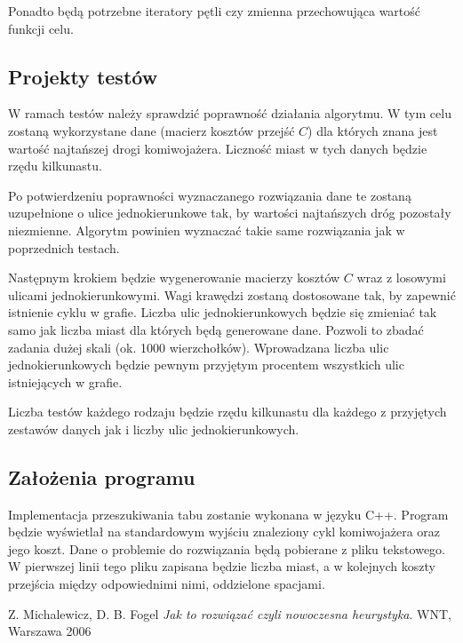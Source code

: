 \documentclass[11pt,a4paper,twoside]{article}
\begin{document}
Ponadto będą potrzebne iteratory pętli czy zmienna przechowująca wartość funkcji celu.

\subsection{Projekty testów}
W ramach testów należy sprawdzić poprawność działania algorytmu. W tym celu zostaną wykorzystane dane (macierz kosztów przejść $C$) dla których znana jest wartość najtańszej drogi komiwojażera. Liczność miast w tych danych będzie rzędu kilkunastu.

Po potwierdzeniu poprawności wyznaczanego rozwiązania dane te zostaną uzupełnione o ulice jednokierunkowe tak, by wartości najtańszych dróg pozostały niezmienne. Algorytm powinien wyznaczać takie same rozwiązania jak w poprzednich testach.

Następnym krokiem będzie wygenerowanie macierzy kosztów $C$ wraz z losowymi ulicami jednokierunkowymi. Wagi krawędzi zostaną dostosowane tak, by zapewnić istnienie cyklu w grafie. Liczba ulic jednokierunkowych będzie się zmieniać tak samo jak liczba miast dla których będą generowane dane. Pozwoli to zbadać zadania dużej skali (ok. 1000 wierzchołków). Wprowadzana liczba ulic jednokierunkowych będzie pewnym przyjętym procentem wszystkich ulic istniejących w grafie.

Liczba testów każdego rodzaju będzie rzędu kilkunastu dla każdego z przyjętych zestawów danych jak i liczby ulic jednokierunkowych.
\subsection{Założenia programu}
Implementacja przeszukiwania tabu zostanie wykonana w języku C++. Program będzie wyświetlał na standardowym wyjściu znaleziony cykl komiwojażera oraz jego koszt. Dane o problemie do rozwiązania będą pobierane z pliku tekstowego. W pierwszej linii tego pliku zapisana będzie liczba miast, a w kolejnych koszty przejścia między odpowiednimi nimi, oddzielone spacjami.
 
\begin{thebibliography}{9}
Z. Michalewicz, D. B. Fogel
\emph{Jak to rozwiązać czyli nowoczesna heurystyka}.
WNT, Warszawa 2006
\end{thebibliography}
\end{document}
